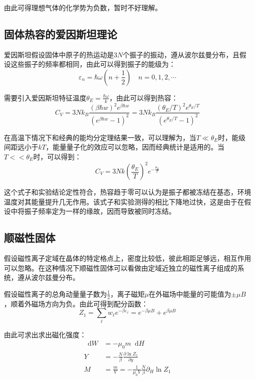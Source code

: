 \documentclass[UTF8]{ctexart}
\newcommand*{\dif}{\mathop{}\!\mathrm{d}}
\begin{document}
\noindent 由此可得理想气体的化学势为负数，暂时不好理解。

	\subsection{固体热容的爱因斯坦理论}
	爱因斯坦假设固体中原子的热运动是$ 3N $个振子的振动，遵从波尔兹曼分布，且假设这些振子的频率都相同，由此可以得到振子的能级为：
	\begin{equation}
		\varepsilon_{n}=\hbar \omega \left(n+\frac{1}{2}\right) \quad n=0,1,2,\cdots
	\end{equation}
	
	需要引入爱因斯坦特征温度$ \theta_{E}=\frac{\hbar \omega}{k} $，由此可以得到热容：
	\begin{equation}
	C_{V}=3 N k_{B} \frac{(\beta \hbar w)^{2} e^{\beta \hbar w}}{\left(e^{\beta \hbar w}-1\right)^{2}}=3 N k_{B} \frac{\left(\theta_{E} / T\right)^{2} e^{\theta_{E} / T}}{\left(e^{\theta_{E} / T}-1\right)^{2}}
	\end{equation}
	
\noindent 在高温下情况下和经典的能均分定理结果一致，可以理解为，当$ T\ll \theta_{E} $时，能级间距远小于$ kT $，能量量子化的效应可以忽略，因而经典统计是适用的。当$ T<< \theta_{E} $时，可以得到：
	\begin{equation}
		C_{V}=3Nk \left(\frac{\theta_{E}}{T}\right)^{2} e^{-\frac{\theta_{E}}{T}}
	\end{equation}
	
\noindent 这个式子和实验结论定性符合，热容趋于零可以认为是振子都被冻结在基态，环境温度对其能量提升几无作用。该式子和实验测得的相比下降地过快，这是由于在假设中将振子频率定为一样的缘故，因而导致被同时冻结。

	\subsection{顺磁性固体}
	假设磁性离子定域在晶体的特定格点上，密度比较低，彼此相距足够远，相互作用可以忽略。在这种情况下顺磁性固体可以看做由定域近独立的磁性离子组成的系统，遵从波尔兹曼分布。
	
	假设磁性离子的总角动量量子数为$ \frac{1}{2} $，离子磁矩$ \mu $在外磁场中能量的可能值为$\pm \mu B$，顺着外磁场方向为负。由此可得到配分函数：
	\begin{equation}
		Z_{1}=\sum_{\ell} w_{\ell} e^{-\beta \varepsilon_{\ell}}=e^{-\beta \mu B}+e^{\beta \mu B}
	\end{equation}
	
\noindent 由此可求出求出磁化强度：
	\begin{equation}
	\begin{aligned}
		\dif W&=-\mu_{0} m \dif H\\
		Y&=-\frac{N}{\beta} \frac{\partial \ln Z_{1}}{\partial y}\\
		M&=\frac{m}{V}=-\frac{1}{\mu_{0} V} \frac{N}{\beta} \partial_{H} \ln Z_{1}
	\end{aligned}
	\end{equation}
	
\end{document}
